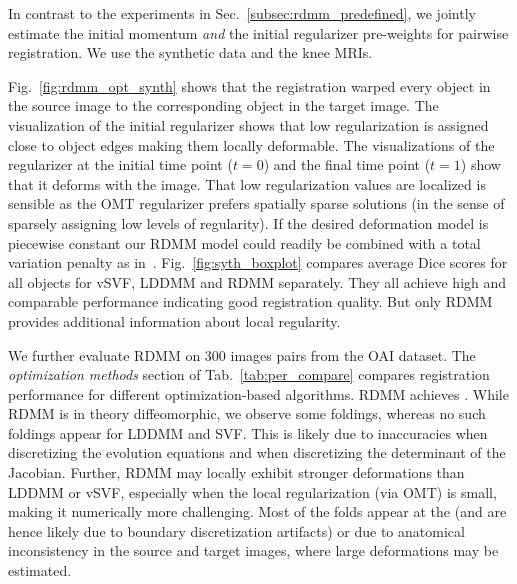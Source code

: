 \documentclass{article}
\numberwithin{equation}{section}
\newcommand{\zy}[1]{{\color{black}{#1}}}
\begin{document}
In contrast to the experiments in Sec.~\ref{subsec:rdmm_predefined}, we jointly estimate the initial momentum \emph{and} the initial regularizer pre-weights  for pairwise registration. We use the synthetic data and the knee MRIs.

Fig.~\ref{fig:rdmm_opt_synth} shows that the registration warped every object in the source image to the corresponding object in the target image. The visualization of the initial regularizer shows that low regularization is assigned close to object edges making them locally deformable. The visualizations of the regularizer at the initial time point ($t=0$) and the final time point ($t=1$) show that it deforms with the image. That low regularization values are localized is sensible as the OMT regularizer prefers spatially sparse solutions (in the sense of sparsely assigning low levels of regularity). If the desired deformation model is piecewise constant our RDMM model could readily be combined with a total variation penalty as in~\citep{niethammer2019_cvpr}. Fig.~\ref{fig:syth_boxplot} compares average Dice scores for all objects for vSVF, LDDMM and RDMM separately. They all achieve high and comparable performance indicating good registration quality. But only RDMM provides additional information about local regularity.

We further evaluate RDMM on 300 images pairs from the OAI dataset. The {\it optimization methods} section of Tab.~\ref{tab:per_compare} compares registration performance for different optimization-based algorithms. RDMM achieves \zy{high performance}. While RDMM is in theory diffeomorphic, we observe some foldings, whereas no such foldings appear for LDDMM and SVF. This is likely due to inaccuracies when discretizing the evolution equations and when discretizing the determinant of the Jacobian. Further, RDMM may locally exhibit stronger deformations than LDDMM or vSVF, especially when the local regularization (via OMT) is small, making it numerically more challenging. Most of the folds appear at the \zy{image boundary} (and are hence likely due to boundary discretization artifacts) or due to anatomical inconsistency in the source and target images, where large deformations may be estimated.
\end{document}
